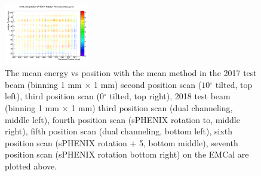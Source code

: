 \documentclass[hidelinks,11pt]{article}
\numberwithin{figure}{section}
\numberwithin{table}{section}
\newcommand{\degree}{\mbox{$^\circ$}\xspace}
\begin{document}
\begin{figure}[hbtp]
\begin{center}
\includegraphics[width=0.33\textwidth]{Plots/EnpoMeanMethod/EnPo20187thScan.png}
\caption{The mean energy vs position with the mean method in the 2017 test beam (binning 1 mm $\times$ 1 mm) second position scan ($10 \degree$ tilted, top left), third position scan ($0 \degree$ tilted, top right), 2018 test beam (binning 1 mm $\times$ 1 mm)  third position scan (dual channeling, middle left), fourth position scan (sPHENIX rotation to, middle right), fifth position scan (dual channeling, bottom left), sixth position scan (sPHENIX rotation + 5, bottom middle),  seventh position scan (sPHENIX rotation bottom right) on the EMCal are plotted above.}
\label{fig:MeanMethod}
\end{center}
\end{figure} 
\end{document}
